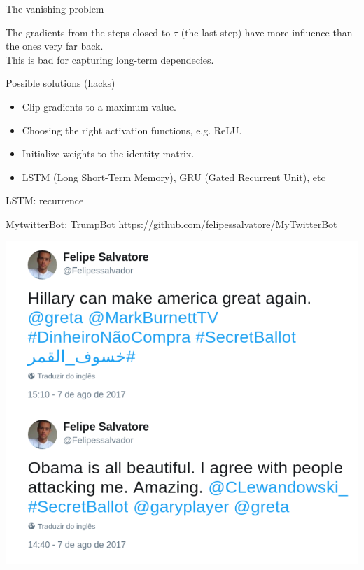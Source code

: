 \documentclass[10pt]{beamer}
\begin{document}
\begin{frame}{The vanishing problem}

The gradients from the steps closed to $\tau$ (the last step) have more influence than the ones very far back.\\

This is bad for capturing \alert{long-term dependecies}.
\end{frame}

\begin{frame}{Possible solutions (hacks)}
\begin{itemize}
\item Clip gradients to a maximum value.
\vspace{0.4cm}
\item Choosing the right activation functions, e.g. ReLU.
\vspace{0.4cm}
\item Initialize weights to the identity matrix.
\vspace{0.4cm}
\item LSTM (Long Short-Term Memory), GRU (Gated Recurrent Unit), etc
\end{itemize}
\end{frame}

\begin{frame}{LSTM: recurrence}

\end{frame}


\begin{frame}{MytwitterBot: TrumpBot}
\url{https://github.com/felipessalvatore/MyTwitterBot}
\begin{center}
\includegraphics[scale=0.24]{images/TrumpBot.png}
\end{center}
\end{frame}
\end{document}
